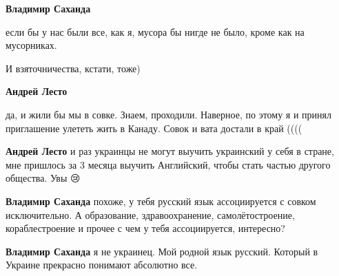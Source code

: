 \begin{itemize}
\begin{itemize}
\textbf{Владимир Саханда} 

если бы у нас были все, как я, мусора бы нигде не было, кроме как на
мусорниках.

И взяточничества, кстати, тоже)

 
\textbf{Андрей Лесто} 

да, и жили бы мы в совке. Знаем, проходили. Наверное, по этому я и принял
приглашение улететь жить в Канаду. Совок и вата достали в край ((((

 
\textbf{Андрей Лесто} и раз украинцы не могут выучить украинский у себя в стране, мне пришлось за 3 месяца выучить Английский, чтобы стать частью другого общества. Увы 😢

 
\textbf{Владимир Саханда} похоже, у тебя русский язык ассоциируется с совком исключительно.
А образование, здравоохранение, самолётостроение, кораблестроение и прочее с чем у тебя ассоциируется, интересно?

 
\textbf{Владимир Саханда} я не украинец. Мой родной язык русский. Который в Украине прекрасно понимают абсолютно все.

 

\end{itemize}
\end{itemize}
